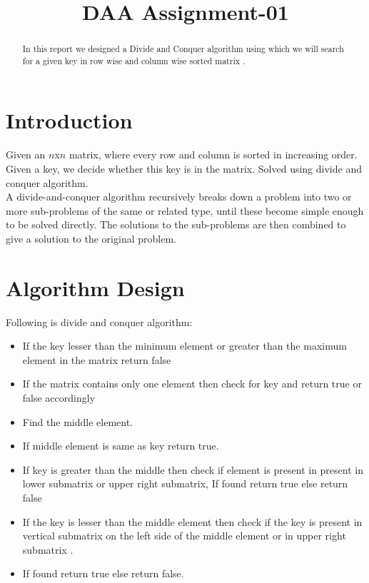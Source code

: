 \documentclass[conference]{IEEEtran}
\begin{document}
\title{DAA Assignment-01\\
}

\author{
\and
{}
\and
{}
}

\maketitle

\begin{abstract}
In this report we designed a Divide and Conquer algorithm using which we  will search for a given key in row wise and column wise sorted matrix .

\end{abstract}

\section{Introduction}
Given an $n$x$n$ matrix, where every row and column is sorted in increasing order. Given a key, we decide whether this key is in the matrix. Solved using divide and conquer algorithm.\\
A divide-and-conquer algorithm recursively breaks down a problem into two or more sub-problems of the same or related type, until these become simple enough to be solved directly. The solutions to the sub-problems are then combined to give a solution to the original problem.


\section{Algorithm Design}
Following is divide and conquer algorithm:
\begin{itemize}
\item If the key lesser than the minimum element or greater than the maximum element in the matrix return false
\item If the matrix contains only one element then check for key and return true or false accordingly
\item Find the middle element.
\item If middle element is same as key return true.
\item If key is greater than the middle  then check if element is present in present in lower submatrix or upper right submatrix, If found return true else return false
\item If the key is lesser than the middle element then check if the key is present in vertical submatrix on the left side of the middle element or in upper right submatrix .
\item If found return true else return false.
\end{itemize}
\end{document}
